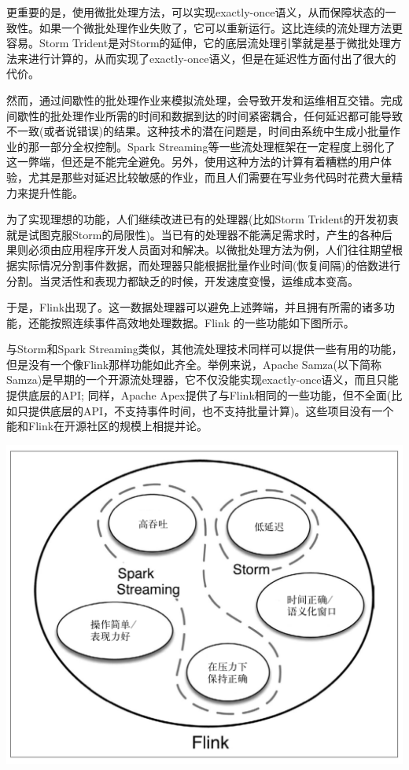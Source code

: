 \documentclass[oneside]{ctexbook}
\begin{document}
更重要的是，使用微批处理方法，可以实现exactly-once语义，从而保障状态的一致性。如果一个微批处理作业失败了，它可以重新运行。这比连续的流处理方法更容易。Storm Trident是对Storm的延伸，它的底层流处理引擎就是基于微批处理方法来进行计算的，从而实现了exactly-once语义，但是在延迟性方面付出了很大的代价。

然而，通过间歇性的批处理作业来模拟流处理，会导致开发和运维相互交错。完成间歇性的批处理作业所需的时间和数据到达的时间紧密耦合，任何延迟都可能导致不一致(或者说错误)的结果。这种技术的潜在问题是，时间由系统中生成小批量作业的那一部分全权控制。Spark Streaming等一些流处理框架在一定程度上弱化了这一弊端，但还是不能完全避免。另外，使用这种方法的计算有着糟糕的用户体验，尤其是那些对延迟比较敏感的作业，而且人们需要在写业务代码时花费大量精力来提升性能。

为了实现理想的功能，人们继续改进已有的处理器(比如Storm Trident的开发初衷就是试图克服Storm的局限性)。当已有的处理器不能满足需求时，产生的各种后果则必须由应用程序开发人员面对和解决。以微批处理方法为例，人们往往期望根据实际情况分割事件数据，而处理器只能根据批量作业时间(恢复间隔)的倍数进行分割。当灵活性和表现力都缺乏的时候，开发速度变慢，运维成本变高。

于是，Flink出现了。这一数据处理器可以避免上述弊端，并且拥有所需的诸多功能，还能按照连续事件高效地处理数据。Flink 的一些功能如下图所示。

与Storm和Spark Streaming类似，其他流处理技术同样可以提供一些有用的功能，但是没有一个像Flink那样功能如此齐全。举例来说，Apache Samza(以下简称Samza)是早期的一个开源流处理器，它不仅没能实现exactly-once语义，而且只能提供底层的API; 同样，Apache Apex提供了与Flink相同的一些功能，但不全面(比如只提供底层的API，不支持事件时间，也不支持批量计算)。这些项目没有一个能和Flink在开源社区的规模上相提并论。

\noindent \includegraphics[width=\textwidth]{flinkvsother.png}
\end{document}
